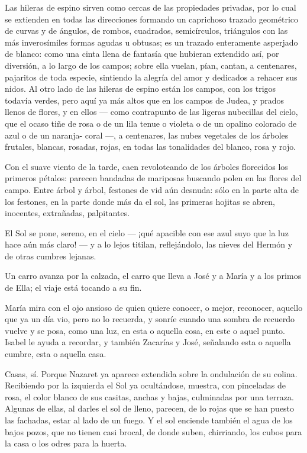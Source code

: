 \documentclass[12pt]{book} %
\begin{document}
Las hileras de espino sirven como cercas de las propiedades privadas, por lo cual se extienden en todas las direcciones formando un caprichoso trazado geométrico de curvas y de ángulos, de rombos, cuadrados, semicírculos, triángulos con las más inverosímiles formas agudas u obtusas; es un trazado enteramente asperjado de blanco: como una cinta llena de fantasía que hubieran extendido así, por diversión, a lo largo de los campos; sobre ella vuelan, pían, cantan, a centenares, pajaritos de toda especie, sintiendo la alegría del amor y dedicados a rehacer sus nidos. Al otro lado de las hileras de espino están los campos, con los trigos todavía verdes, pero aquí ya más altos que en los campos de Judea, y prados llenos de flores, y en ellos — como contrapunto de las ligeras nubecillas del cielo, que el ocaso tiñe de rosa o de un lila tenue o violeta o de un opalino colorado de azul o de un naranja- coral —, a centenares, las nubes vegetales de los árboles frutales, blancas, rosadas, rojas, en todas las tonalidades del blanco, rosa y rojo. 

Con el suave viento de la tarde, caen revoloteando de los árboles florecidos los primeros pétalos: parecen bandadas de mariposas buscando polen en las flores del campo. Entre árbol y árbol, festones de vid aún desnuda: sólo en la parte alta de los festones, en la parte donde más da el sol, las primeras hojitas se abren, inocentes, extrañadas, palpitantes. 

El Sol se pone, sereno, en el cielo — ¡qué apacible con ese azul suyo que la luz hace aún más claro! — y a lo lejos titilan, reflejándolo, las nieves del Hermón y de otras cumbres lejanas. 

Un carro avanza por la calzada, el carro que lleva a José y a María y a los primos de Ella; el viaje está tocando a su fin. 

María mira con el ojo ansioso de quien quiere conocer, o mejor, reconocer, aquello que ya un día vio, pero no lo recuerda, y sonríe cuando una sombra de recuerdo vuelve y se posa, como una luz, en esta o aquella cosa, en este o aquel punto. Isabel le ayuda a recordar, y también Zacarías y José, señalando esta o aquella cumbre, esta o aquella casa. 

Casas, sí. Porque Nazaret ya aparece extendida sobre la ondulación de su colina. Recibiendo por la izquierda el Sol ya ocultándose, muestra, con pinceladas de rosa, el color blanco de sus casitas, anchas y bajas, culminadas por una terraza. Algunas de ellas, al darles el sol de lleno, parecen, de lo rojas que se han puesto las fachadas, estar al lado de un fuego. Y el sol enciende también el agua de los bajos pozos, que no tienen casi brocal, de donde suben, chirriando, los cubos para la casa o los odres para la huerta. 
\end{document}
